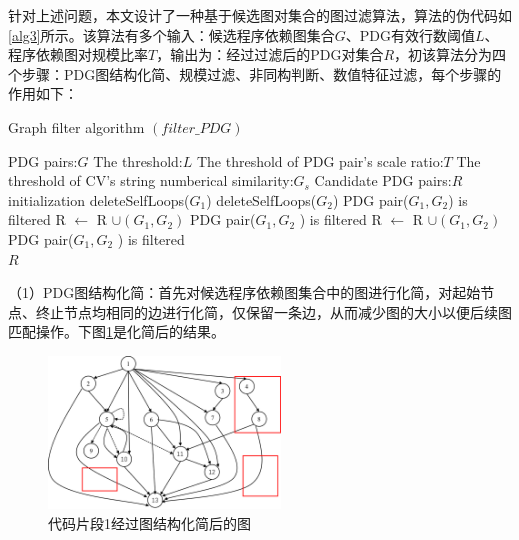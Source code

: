 针对上述问题，本文设计了一种基于候选图对集合的图过滤算法，算法的伪代码如\ref{alg3}所示。该算法有多个输入：候选程序依赖图集合$G$、PDG有效行数阈值$L$、程序依赖图对规模比率$T$，输出为：经过过滤后的PDG对集合$R$，初该算法分为四个步骤：PDG图结构化简、规模过滤、非同构判断、数值特征过滤，每个步骤的作用如下：

\begin{algorithm}[ht]  
	\renewcommand{\algorithmicrequire}{\textbf{Input:}}
	\renewcommand{\algorithmicensure}{\textbf{Output:}}
	\caption{Graph filter algorithm $\left(filter\_PDG\right)$}  
	\label{alg3}
	\begin{algorithmic}[1]
    \Require PDG pairs:$G$
    \Require The threshold:$L$
    \Require The threshold of PDG pair's scale ratio:$T$
    \Require The threshold of CV's string numberical similarity:$G_s$
		\Ensure Candidate PDG pairs:$R$
    \State initialization
      \State deleteSelfLoops($G_1$)
      \State deleteSelfLoops($G_2$) 
        \State PDG pair($G_1,G_2$) is filtered 
      \Else
           
            \State R $\leftarrow$ R $\cup \left(G_1,G_2\right)$ 
          \Else
            \State PDG pair($G_1,G_2$ ) is filtered
          \EndIf
        \Else
           
            \State R $\leftarrow$ R $\cup \left(G_1,G_2\right)$
          \Else
            \State PDG pair($G_1,G_2$ ) is filtered
          \EndIf
        \EndIf
      \EndIf 
    \EndFor \\
    \Return $R$
	\end{algorithmic}
\end{algorithm}

（1）PDG图结构化简：首先对候选程序依赖图集合中的图进行化简，对起始节点、终止节点均相同的边进行化简，仅保留一条边，从而减少图的大小以便后续图匹配操作。下图\ref{fig:pdgshili3}是化简后的结果。

\begin{figure}[H]
  \centering
  \includegraphics[width=0.55\textwidth]{figures/pdgshili3.png}
  \caption{代码片段1经过图结构化简后的图}\label{fig:pdgshili3}
\end{figure}

